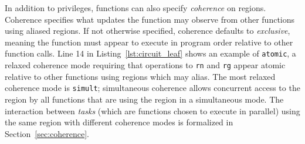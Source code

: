 In addition to privileges, functions can also specify {\em coherence}
on regions.  Coherence specifies what updates the function may
observe from other functions using aliased regions.  
If not otherwise specified, coherence defaults to {\em exclusive}, 
meaning the function must appear to execute in program order relative to
other function calls.  
Line 14 in Listing~\ref{lst:circuit_leaf} shows
an example of {\tt atomic}, a relaxed coherence mode requiring
that operations to {\tt rn} and {\tt rg} appear atomic relative
to other functions using regions which may alias.  The most relaxed coherence
mode is {\tt simult}; simultaneous coherence allows concurrent access 
to the region by all functions that are using the region
in a simultaneous mode.  The interaction between {\em tasks} (which are functions chosen to execute in parallel) using the same
region with different coherence
modes is formalized in Section~\ref{sec:coherence}.



